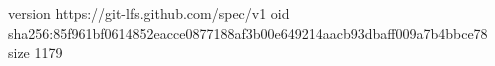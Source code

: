 version https://git-lfs.github.com/spec/v1
oid sha256:85f961bf0614852eacce0877188af3b00e649214aacb93dbaff009a7b4bbce78
size 1179
